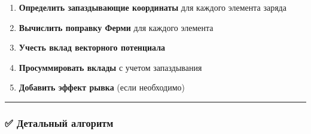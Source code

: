 \documentclass[11pt]{article}
\providecommand{\tightlist}{%
      \setlength{\itemsep}{0pt}\setlength{\parskip}{0pt}}
\begin{document}
\begin{enumerate}
\def\labelenumi{\arabic{enumi}.}
\tightlist
\item
  \textbf{Определить запаздывающие координаты} для каждого элемента
  заряда
\item
  \textbf{Вычислить поправку Ферми} для каждого элемента
\item
  \textbf{Учесть вклад векторного потенциала}
\item
  \textbf{Просуммировать вклады} с учетом запаздывания
\item
  \textbf{Добавить эффект рывка} (если необходимо)
\end{enumerate}

\begin{center}\rule{0.5\linewidth}{\linethickness}\end{center}

\subsubsection{✅ Детальный
алгоритм}\label{ux434ux435ux442ux430ux43bux44cux43dux44bux439-ux430ux43bux433ux43eux440ux438ux442ux43c}
\end{document}
